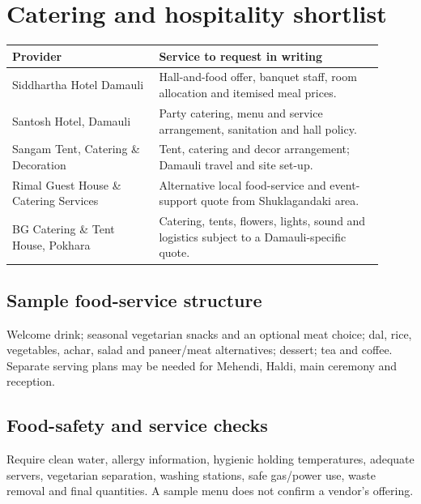 \section{Catering and hospitality shortlist}
\begin{longtable}{p{0.36\linewidth}p{0.55\linewidth}}
\toprule
\textbf{Provider} & \textbf{Service to request in writing}\\\midrule
Siddhartha Hotel Damauli & Hall-and-food offer, banquet staff, room allocation and itemised meal prices.\\
Santosh Hotel, Damauli & Party catering, menu and service arrangement, sanitation and hall policy.\\
Sangam Tent, Catering \& Decoration & Tent, catering and decor arrangement; Damauli travel and site set-up.\\
Rimal Guest House \& Catering Services & Alternative local food-service and event-support quote from Shuklagandaki area.\\
BG Catering \& Tent House, Pokhara & Catering, tents, flowers, lights, sound and logistics subject to a Damauli-specific quote.\\
\bottomrule
\end{longtable}

\subsection{Sample food-service structure}
Welcome drink; seasonal vegetarian snacks and an optional meat choice; dal, rice, vegetables, achar, salad and paneer/meat alternatives; dessert; tea and coffee. Separate serving plans may be needed for Mehendi, Haldi, main ceremony and reception.

\subsection{Food-safety and service checks}
Require clean water, allergy information, hygienic holding temperatures, adequate servers, vegetarian separation, washing stations, safe gas/power use, waste removal and final quantities. A sample menu does not confirm a vendor's offering.
